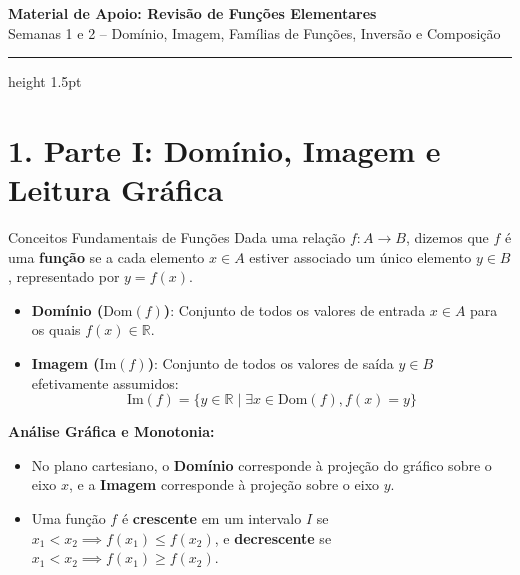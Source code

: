 \documentclass[12pt,a4paper]{article}
\begin{document}
\begin{center}
  \vspace*{-0.3cm}
  {\LARGE\bfseries\color{primary} Material de Apoio: Revisão de Funções Elementares} \\[0.2cm]
  {\small\sffamily\color{gray} Semanas 1 e 2 -- Domínio, Imagem, Famílias de Funções, Inversão e Composição}
  \vspace*{0.3cm}
  \hrule height 1.5pt \color{primary}
\end{center}

\vspace{0.3cm}

\section*{1. Parte I: Domínio, Imagem e Leitura Gráfica}

\begin{definicao}{Conceitos Fundamentais de Funções}
    Dada uma relação $f: A \to B$, dizemos que $f$ é uma \textbf{função} se a cada elemento $x \in A$ estiver associado um único elemento $y \in B$, representado por $y = f(x)$.
    \begin{itemize}
        \item \textbf{Domínio ($\text{Dom}(f)$)}: Conjunto de todos os valores de entrada $x \in A$ para os quais $f(x) \in \mathbb{R}$.
        \item \textbf{Imagem ($\text{Im}(f)$)}: Conjunto de todos os valores de saída $y \in B$ efetivamente assumidos: 
        $$\text{Im}(f) = \{y \in \mathbb{R} \mid \exists x \in \text{Dom}(f), f(x) = y\}$$
    \end{itemize}
\end{definicao}

\noindent \textbf{Análise Gráfica e Monotonia:}
\begin{itemize}
    \item No plano cartesiano, o \textbf{Domínio} corresponde à projeção do gráfico sobre o eixo $x$, e a \textbf{Imagem} corresponde à projeção sobre o eixo $y$.
    \item Uma função $f$ é \textbf{crescente} em um intervalo $I$ se $x_1 < x_2 \implies f(x_1) \le f(x_2)$, e \textbf{decrescente} se $x_1 < x_2 \implies f(x_1) \ge f(x_2)$.
\end{itemize}
\end{document}
